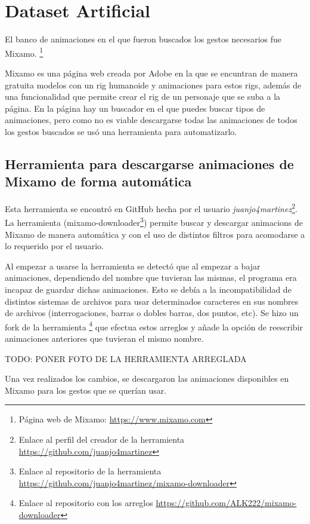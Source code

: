 \section{Dataset Artificial}
\label{sec:datasetArtificial}

El banco de animaciones en el que fueron buscados los gestos necesarios fue Mixamo. \footnote{Página web de Mixamo: \url{https://www.mixamo.com}}

Mixamo es una página web creada por Adobe en la que se encuntran de manera gratuita modelos con un \gls{rig} humanoide y animaciones para estos rigs, además de una funcionalidad que permite crear el \gls{rig} de un personaje que se suba a la página.
En la página hay un buscador en el que puedes buscar tipos de animaciones, pero como no es viable descargarse todas las animaciones de todos los gestos buscados se usó una herramienta para automatizarlo.

\subsection{Herramienta para descargarse animaciones de Mixamo de forma automática}

Esta herramienta se encontró en GitHub hecha por el usuario \textit{juanjo4martinez}\footnote{Enlace al perfil del creador de la herramienta \url{https://github.com/juanjo4martinez}}. La herramienta (mixamo-downloader\footnote{Enlace al repositorio de la herramienta \url{https://github.com/juanjo4martinez/mixamo-downloader}}) permite buscar y descargar animacions de Mixamo de manera automática y con el uso de distintos filtros para acomodarse a lo requerido por el usuario.

Al empezar a usarse la herramienta se detectó que al empezar a bajar animaciones, dependiendo del nombre que tuvieran las mismas, el programa era incapaz de guardar dichas animaciones. Esto se debía a la incompatibilidad de distintos sistemas de archivos para usar determinados caracteres en sus nombres de archivos (interrogaciones, barras o dobles barras, dos puntos, etc). Se hizo un \gls{fork} de la herramienta \footnote{Enlace al repositorio con los arreglos \url{https://github.com/ALK222/mixamo-downloader}} que efectua estos arreglos y añade la opción de reescribir animaciones anteriores que tuvieran el mismo nombre.

TODO: PONER FOTO DE LA HERRAMIENTA ARREGLADA

Una vez realizados los cambios, se descargaron las animaciones disponibles en Mixamo para los gestos que se querían usar.

